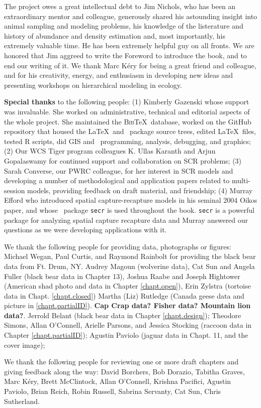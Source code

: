 
The project owes a great intellectual debt to Jim Nichols, who has
been an extraordinary mentor and colleague, generously shared his
astounding insight into animal sampling and modeling problems, his
knowledge
of the listerature and history of abundance and density estimation
and, most importantly, his extremely valuable time. 
He has 
been extremely helpful guy on all fronts. We are honored that Jim
aggreed to write the Foreword to introduce the book, and to end our
writing of it.
 We thank Marc K\'{e}ry
for being a great friend and colleague, and for his creativity, %
energy, and enthusiasm in developing new ideas and
presenting workshops on hierarchical modeling in ecology.

{\bf Special thanks} to the following people: (1) Kimberly Gazenski whose support was
invaluable. She worked on administrative, technical and editorial
aspects of the whole project. She maintained the \textsc{Bib}\TeX~database,
worked on the GitHub repository that housed the \LaTeX~and \R~package
source trees, edited \LaTeX~files, tested R scripts, did GIS and
\R~programming, analysis, debugging, and graphics;  (2) Our WCS Tiger
program colleagues K. Ullas Karanth and Arjun Gopalaswamy for
continued support and collaboration on SCR problems;  (3) Sarah
Converse, our PWRC colleague, for her interest in SCR models and
developing a number of methodological and application papers related
to multi-session models, providing feedback on draft material, and
friendship;  (4) Murray Efford who introduced spatial
capture-recapture models %
in his seminal 2004 Oikos paper, and whose \R~package \mbox{\tt secr} is used
throughout the book.  \mbox{\tt secr} is a powerful package for analyzing
spatial capture recapture data and Murray answered our questions as we
were developing applications with it.


We thank the following people for providing data, photographs or figures:
Michael Wegan, Paul Curtis, and Raymond Rainbolt for providing the black bear data from Ft. Drum, NY.
Audrey Magoun (wolverine data), Cat Sun and Angela Fuller (black bear
data in Chapter 13), Joshua Raabe and Joseph Hightower (American shad
photo and data in Chapter \ref{chapt.open}), Erin Zylstra (tortoise
data in Chapt. \ref{chapt.closed}) Martha (Liz) Rutledge (Canada geese
data and picture in \ref{chapt.partialID}).  {\bf Cap Crap data?
  Fisher data?  Mountain lion data?}.  Jerrold Belant (black bear data
in Chapter \ref{chapt.design}); Theodore Simons, Allan O'Connell,
Arielle Parsons, and Jessica Stocking (raccoon data in Chapter
\ref{chapt.partialID}); Agustin Paviolo (jaguar data in Chapt. 11, and
the cover image);

We thank the following people for reviewing one or more draft chapters
and giving feedback along the way:
David Borchers,
Bob Dorazio,
Tabitha Graves,
Marc K\'{e}ry,
Brett McClintock,
Allan O'Connell,
Krishna Pacifici,
Agustin Paviolo,
Brian Reich,
Robin Russell,
Sabrina Servanty,
Cat Sun,
Chris Sutherland.

